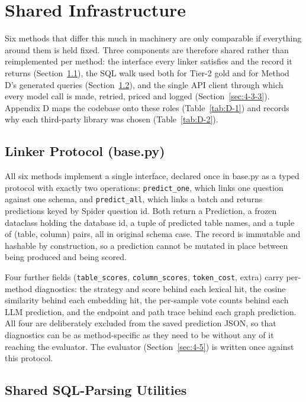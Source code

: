 \section{Shared Infrastructure}\label{sec:4-3}

Six methods that differ this much in machinery are only comparable if everything around them is held fixed. Three components are therefore shared rather than reimplemented per method: the interface every linker satisfies and the record it returns (Section~\ref{sec:4-3-1}), the SQL walk used both for Tier-2 gold and for Method D's generated queries (Section~\ref{sec:4-3-2}), and the single API client through which every model call is made, retried, priced and logged (Section~\ref{sec:4-3-3}). Appendix D maps the codebase onto these roles (Table~\ref{tab:D-1}) and records why each third-party library was chosen (Table~\ref{tab:D-2}).

\subsection{Linker Protocol (base.py)}\label{sec:4-3-1}

All six methods implement a single interface, declared once in base.py as a typed protocol with exactly two operations: \texttt{predict\_one}, which links one question against one schema, and \texttt{predict\_all}, which links a batch and returns predictions keyed by Spider question id. Both return a Prediction, a frozen dataclass holding the database id, a tuple of predicted table names, and a tuple of (table, column) pairs, all in original schema case. The record is immutable and hashable by construction, so a prediction cannot be mutated in place between being produced and being scored.

Four further fields (\texttt{table\_scores}, \texttt{column\_scores}, \texttt{token\_cost}, extra) carry per-method diagnostics: the strategy and score behind each lexical hit, the cosine similarity behind each embedding hit, the per-sample vote counts behind each LLM prediction, and the endpoint and path trace behind each graph prediction. All four are deliberately excluded from the saved prediction JSON, so that diagnostics can be as method-specific as they need to be without any of it reaching the evaluator. The evaluator (Section~\ref{sec:4-5}) is written once against this protocol.

\subsection{Shared SQL-Parsing Utilities}\label{sec:4-3-2}

